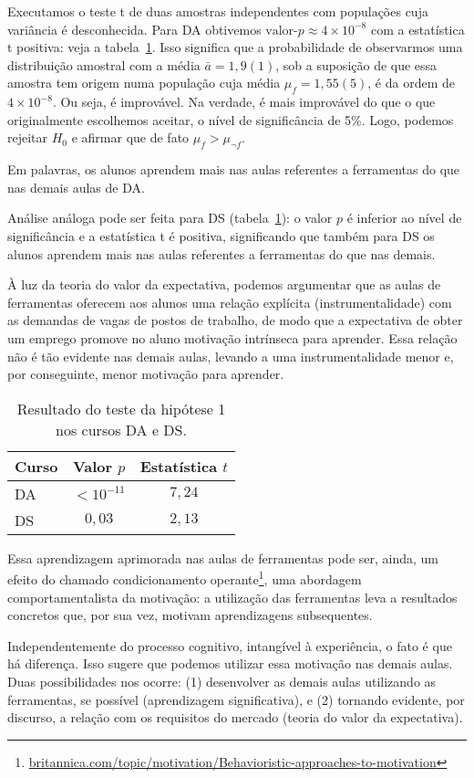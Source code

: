 Executamos o teste t de duas amostras independentes com populações cuja variância é desconhecida.
Para DA obtivemos $\text{valor-}p \approx 4\times10^{-8}$ com a estatística t positiva: veja a tabela~\ref{tab:hipotese-1}.
Isso significa que a probabilidade de observarmos uma distribuição amostral com a média $\bar a = 1,9(1)$, sob a suposição de que essa amostra tem origem numa população cuja média $\mu_f = 1,55(5)$, é da ordem de $4\times10^{-8}$.
Ou seja, é improvável.
Na verdade, é mais improvável do que o que originalmente escolhemos aceitar, o nível de significância de 5\%.
Logo, podemos rejeitar $H_0$ e afirmar que de fato $\mu_{f} > \mu_{\neg f}$.

Em palavras, os alunos aprendem mais nas aulas referentes a ferramentas do que nas demais aulas de DA.


Análise análoga pode ser feita para DS (tabela~\ref{tab:hipotese-1}): o valor $p$ é inferior ao nível de significância e a estatística t é positiva, significando que também para DS os alunos aprendem mais nas aulas referentes a ferramentas do que nas demais.

À luz da teoria do valor da expectativa, podemos argumentar que as aulas de ferramentas oferecem aos alunos uma relação explícita (instrumentalidade) com as demandas de vagas de postos de trabalho, de modo que a expectativa de obter um emprego promove no aluno motivação intrínseca para aprender.
Essa relação não é tão evidente nas demais aulas, levando a uma instrumentalidade menor e, por conseguinte, menor motivação para aprender.


\begin{table}
	\centering
	\caption{Resultado do teste da hipótese 1 nos cursos DA e DS.}
	\label{tab:hipotese-1}

	\begin{tabular}{lcc}
	\toprule
	Curso & Valor $p$   & Estatística $t$ \\
	\midrule
	DA    & $<10^{-11}$ & $7,24$ \\
	DS    & $0,03$      & $2,13$ \\ 
	\bottomrule
	\end{tabular}
\end{table}

Essa aprendizagem aprimorada nas aulas de ferramentas pode ser, ainda, um efeito do chamado condicionamento operante\footnote{\url{britannica.com/topic/motivation/Behavioristic-approaches-to-motivation}}, uma abordagem comportamentalista da motivação: a utilização das ferramentas leva a resultados concretos que, por sua vez, motivam aprendizagens subsequentes.

Independentemente do processo cognitivo, intangível à experiência, o fato é que há diferença.
Isso sugere que podemos utilizar essa motivação nas demais aulas.
Duas possibilidades nos ocorre: (1) desenvolver as demais aulas utilizando as ferramentas, se possível (aprendizagem significativa), e (2) tornando evidente, por discurso, a relação com os requisitos do mercado (teoria do valor da expectativa).